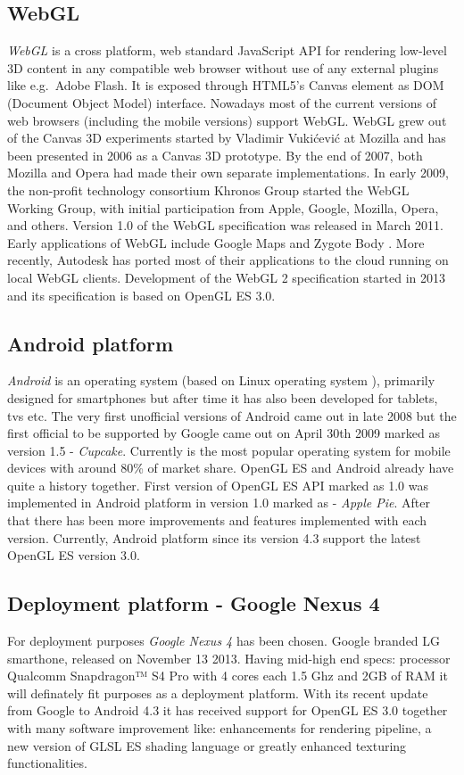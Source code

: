\subsection{WebGL}
\emph{WebGL} \cite{webgl_kronos} is a cross platform, web standard JavaScript API for rendering low-level 3D content in any compatible web browser without use of any external plugins like e.g.\ Adobe Flash.
It is exposed through HTML5's Canvas element as DOM (Document Object Model) interface.
Nowadays most of the current versions of web browsers (including the mobile versions) support WebGL.
WebGL grew out of the Canvas 3D experiments started by Vladimir Vukićević at Mozilla and has been presented in 2006 as a Canvas 3D prototype.
By the end of 2007, both Mozilla and Opera had made their own separate implementations.
In early 2009, the non-profit technology consortium Khronos Group started the WebGL Working Group, with initial participation from Apple, Google, Mozilla, Opera, and others.
Version 1.0 of the WebGL specification was released in March 2011.
Early applications of WebGL include Google Maps and Zygote Body \cite{zygote_body}.
More recently, Autodesk has ported most of their applications to the cloud running on local WebGL clients.
Development of the WebGL 2 specification started in 2013 and its specification is based on OpenGL ES 3.0.

\subsection{Android platform}
\emph{Android} \cite{androidcom} is an operating system (based on Linux operating system \cite{gnulinux}), primarily designed for smartphones but after time it has also been developed for tablets, tvs etc.
The very first unofficial versions of Android came out in late 2008 but the first official to be supported by Google came out on April 30th 2009 marked as version 1.5 - \emph{Cupcake}.
\newline Currently is the most popular operating system for mobile devices with around 80\% of market share.
OpenGL ES and Android already have quite a history together.
First version of OpenGL ES API marked as 1.0 was implemented in Android platform in version 1.0 marked as - \emph{Apple Pie}.
After that there has been more improvements and features implemented with each version.
Currently, Android platform since its version 4.3 support the latest OpenGL ES version 3.0.

\subsection{Deployment platform - Google Nexus 4}
For deployment purposes \emph{Google Nexus 4} has been chosen.
Google branded LG smarthone, released on November 13 2013.
\newline Having mid-high end specs: processor Qualcomm Snapdragon™ S4 Pro with 4 cores each 1.5 Ghz and 2GB of RAM it will definately fit purposes as a deployment platform.
\newline With its recent update from Google to Android 4.3 it has received support for OpenGL ES 3.0 together with many software improvement like: enhancements for rendering pipeline, a new version of GLSL ES shading language or greatly enhanced texturing functionalities.